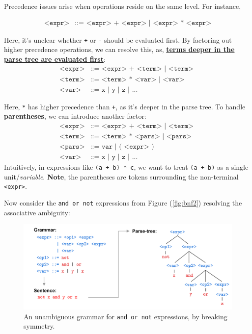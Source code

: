 \begin{theo}

    Precedence issues arise when operations reside on the same level. For instance,
        
    \vspace{-1em}
        \begin{align*}
            \texttt{<expr>} &\texttt{::= <expr> + <expr> | <expr> * <expr>}
        \end{align*}

    \noindent
    Here, it's unclear whether \texttt{+} or \texttt{-} should be evaluated first. By factoring out higher precedence operations, we can resolve this, 
    as, \underline{\textbf{terms deeper in the parse tree are evaluated first}}:
    \begin{align*}
        \texttt{<expr>} &\texttt{::= <expr> + <term> | <term> }\\
        \texttt{<term>} &\texttt{::= <term> * <var> | <var>}\\
        \texttt{<var>} &\texttt{::= x | y | z | ...}
    \end{align*}

    \vspace{-1em}
    \noindent
    Here, \texttt{*} has higher precedence than \texttt{+}, as it's deeper in the parse tree. To handle 
    \textbf{parentheses}, we can introduce another factor:
    \begin{align*}
        \texttt{<expr>} &\texttt{::= <expr> + <term> | <term> }\\
        \texttt{<term>} &\texttt{::= <term> * <pars> | <pars>}\\
        \texttt{<pars>} &\texttt{::= var | ( <expr> )}\\
        \texttt{<var>} &\texttt{::= x | y | z | ...}
    \end{align*}
    \noindent
    Intuitively, in expressions like \texttt{(a + b) * c}, we want to treat \texttt{(a + b)} as a single unit/\textit{variable}. \textbf{Note},
    the parentheses are tokens surrounding the non-terminal \texttt{<expr>}.
\end{theo}

\newpage 

\noindent
Now consider the \texttt{and or not} expressions from Figure (\ref{fig:bnf2}) resolving the associative ambiguity:

\begin{figure}[h]
    \centering
    \includegraphics[width=1\textwidth]{Sections/Formal/amb5.png}
    \caption{An unambiguous grammar for \texttt{and or not} expressions, by breaking symmetry.}
    \label{fig:amb5}
\end{figure}

